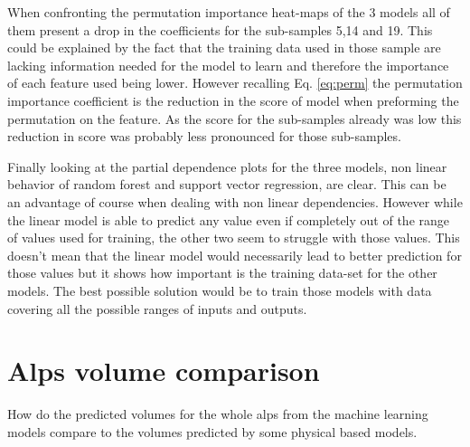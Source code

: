 When confronting the permutation importance heat-maps of the 3 models all of them present a drop in the coefficients for the sub-samples 5,14 and 19. This could be explained by the fact that the training data used in those sample are lacking information needed for the model to learn and therefore the importance of each feature used being lower. However recalling Eq. \ref{eq:perm} the permutation importance coefficient is the reduction in the score of model when preforming the permutation on the feature. As the score for the sub-samples already was low this reduction in score was probably less pronounced for those sub-samples. 

Finally looking at the partial dependence plots for the three models, non linear behavior of random forest and support vector regression, are clear. This can be an advantage of course when dealing with non linear dependencies. However while the linear model is able to predict any value even if completely out of the range of values used for training, the other two seem to struggle with those values. This doesn't mean that the linear model would necessarily lead to better prediction for those values but it shows how important is the training data-set for the other models. The best possible solution would be to train those models with data covering all the possible ranges of inputs and outputs.

\section{Alps volume comparison}\label{Alpscomp}
How do the predicted volumes for the whole alps from the machine learning models compare to the volumes predicted by some physical based models.

